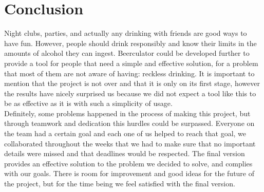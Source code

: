 \section{Conclusion}
\label{sec:conclusion}

Night clubs, parties, and actually any drinking with friends are good ways to have fun. However, people should drink responsibly and know their limits in the amounts of alcohol they can ingest. Beerculator could be developed further to provide a tool for people that need a simple and effective solution, for a problem that most of them are not aware of having: reckless drinking. It is important to mention that the project is not over and that it is only on its first stage, however the results have nicely surprised us because we did not expect a tool like this to be as effective as it is with such a simplicity of usage.\\

Definitely, some problems happened in the process of making this project, but through teamwork and dedication this hurdles could be surpassed. Everyone on the team had a certain goal and each one of us helped to reach that goal, we collaborated throughout the weeks that we had to make sure that no important details were missed and that deadlines would be respected. The final version provides an effective solution to the problem we decided to solve, and complies with our goals. There is room for improvement and good ideas for the future of the project, but for the time being we feel satisfied with the final version.\\   